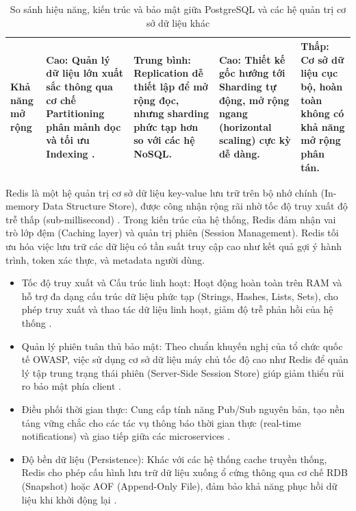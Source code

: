 \begin{landscape}
\begin{table}[h!]
\begin{tabularx}{\linewidth}{|l|X|X|X|X|}
\hline
\textbf{Khả năng mở rộng} & 
Cao: Quản lý dữ liệu lớn xuất sắc thông qua cơ chế Partitioning phân mảnh dọc và tối ưu Indexing \cite{schonig2024}. & 
Trung bình: Replication dễ thiết lập để mở rộng đọc, nhưng sharding phức tạp hơn so với các hệ NoSQL. & 
Cao: Thiết kế gốc hướng tới Sharding tự động, mở rộng ngang (horizontal scaling) cực kỳ dễ dàng. & 
Thấp: Cơ sở dữ liệu cục bộ, hoàn toàn không có khả năng mở rộng phân tán. \\
\hline
\end{tabularx}
\caption{So sánh hiệu năng, kiến trúc và bảo mật giữa PostgreSQL và các hệ quản trị cơ sở dữ liệu khác}
\end{table}
\end{landscape}


Redis là một hệ quản trị cơ sở dữ liệu key-value lưu trữ trên bộ nhớ chính (In-memory Data Structure Store), được công nhận rộng rãi nhờ tốc độ truy xuất độ trễ thấp (sub-millisecond) \cite{redis_docs}. Trong kiến trúc của hệ thống, Redis đảm nhận vai trò lớp đệm (Caching layer) và quản trị phiên (Session Management). Redis tối ưu hóa việc lưu trữ các dữ liệu có tần suất truy cập cao như kết quả gợi ý hành trình, token xác thực, và metadata người dùng.

\begin{itemize}
    \item Tốc độ truy xuất và Cấu trúc linh hoạt: Hoạt động hoàn toàn trên RAM và hỗ trợ đa dạng cấu trúc dữ liệu phức tạp (Strings, Hashes, Lists, Sets), cho phép truy xuất và thao tác dữ liệu linh hoạt, giảm độ trễ phản hồi của hệ thống \cite{redis_docs}.
    \item Quản lý phiên tuân thủ bảo mật: Theo chuẩn khuyến nghị của tổ chức quốc tế OWASP, việc sử dụng cơ sở dữ liệu máy chủ tốc độ cao như Redis để quản lý tập trung trạng thái phiên (Server-Side Session Store) giúp giảm thiểu rủi ro bảo mật phía client \cite{owasp_session}.
    \item Điều phối thời gian thực: Cung cấp tính năng Pub/Sub nguyên bản, tạo nền tảng vững chắc cho các tác vụ thông báo thời gian thực (real-time notifications) và giao tiếp giữa các microservices \cite{redis_pubsub}.
    \item Độ bền dữ liệu (Persistence): Khác với các hệ thống cache truyền thống, Redis cho phép cấu hình lưu trữ dữ liệu xuống ổ cứng thông qua cơ chế RDB (Snapshot) hoặc AOF (Append-Only File), đảm bảo khả năng phục hồi dữ liệu khi khởi động lại \cite{redis_persistence}.
\end{itemize}

